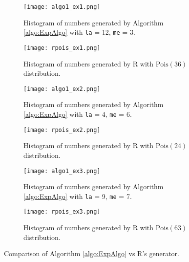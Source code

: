 \documentclass[letterpaper, 10 pt, conference]{article}
\begin{document}
 \begin{figure}
	\centering
	\begin{subfigure}[b]{0.4\linewidth}
		\texttt{[image: algo1\_ex1.png]}
		\caption{Histogram of numbers generated by Algorithm \ref{algo:ExpAlgo} with \texttt{la} = 12, \texttt{me} = 3.}
		\label{fig:algo1_ex1}
	\end{subfigure}	
	\hfill
	\begin{subfigure}[b]{0.4\linewidth}
		\texttt{[image: rpois\_ex1.png]}
		\caption{Histogram of numbers generated by R with $\mathrm{Pois}(36)$ distribution.}
		\label{fig:rpois_ex1}
	\end{subfigure}

	\begin{subfigure}[b]{0.4\linewidth}
		\texttt{[image: algo1\_ex2.png]}
		\caption{Histogram of numbers generated by Algorithm \ref{algo:ExpAlgo} with \texttt{la} = 4, \texttt{me} = 6.}
		\label{fig:algo1_ex2}
	\end{subfigure}
	\hfill
	\begin{subfigure}[b]{0.4\linewidth}
		\texttt{[image: rpois\_ex2.png]}
		\caption{Histogram of numbers generated by R with $\mathrm{Pois}(24)$ distribution.}
		\label{fig:rpois_ex2}
	\end{subfigure}

	\begin{subfigure}[b]{0.4\linewidth}
		\texttt{[image: algo1\_ex3.png]}
		\caption{Histogram of numbers generated by Algorithm \ref{algo:ExpAlgo} with \texttt{la} = 9, \texttt{me} = 7.}
		\label{fig:algo1_ex3}
	\end{subfigure}
	\hfill
	\begin{subfigure}[b]{0.4\linewidth}
		\texttt{[image: rpois\_ex3.png]}
	\caption{Histogram of numbers generated by R with $\mathrm{Pois}(63)$ distribution.}
		\label{fig:rpois_ex3}
	\end{subfigure}

	\caption{Comparison of Algorithm \ref{algo:ExpAlgo} vs R's generator.} 
	\label{fig:algorithm1}
\end{figure}
\end{document}
